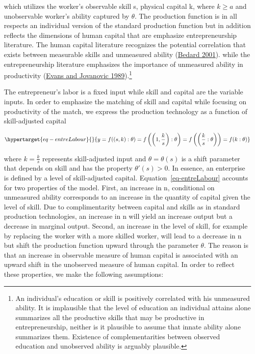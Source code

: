 \documentclass[
  a4paper,
  DIV=11,
  numbers=noendperiod]{scrartcl}
\begin{document}
which utilizes the worker's observable skill s, physical capital k,
where \(k \geq a\) and unobservable worker's ability captured by
\(\theta\). The production function is in all respects an individual
version of the standard production function but in addition reflects the
dimensions of human capital that are emphasize entrepreneurship
literature. The human capital literature recognizes the potential
correlation that exists between measurable skills and unmeasured ability
(\protect\hyperlink{ref-bedard2001}{Bedard 2001}). while the
entrepreneurship literature emphasizes the importance of unmeasured
ability in productivity (\protect\hyperlink{ref-evans1989}{Evans and
Jovanovic 1989}).\footnote{An individual's education or skill is
  positively correlated with his unmeasured ability. It is implausible
  that the level of education an individual attains alone summarizes all
  the productive skills that may be productive in entrepreneurship,
  neither is it plausible to assume that innate ability alone summarizes
  them. Existence of complementarities between observed education and
  unobserved ability is arguably plausible.}

The entrepreneur's labor is a fixed input while skill and capital are
the variable inputs. In order to emphasize the matching of skill and
capital while focusing on productivity of the match, we express the
production technology as a function of skill-adjusted capital

\begin{equation}\protect\hypertarget{eq-entreLabour}{}{
y=f((s,k):\theta)=f\left(\left(1,\frac{k}{s}\right):\theta\right)=f\left(\left(\frac{k}{s}:\theta \right)\right)=f(k:\theta)
}\label{eq-entreLabour}\end{equation}

where \(k=\frac{k}{s}\) represents skill-adjusted input and
\(\theta=\theta(s)\) is a shift parameter that depends on skill and has
the property \(\theta'(s)>0.\) In essence, an enterprise is defined by a
level of skill-adjusted capital. Equation~\ref{eq-entreLabour} accounts
for two properties of the model. First, an increase in n, conditional on
unmeasured ability corresponds to an increase in the quantity of capital
given the level of skill. Due to complimentarity between capital and
skills as in standard production technologies, an increase in n will
yield an increase output but a decrease in marginal output. Second, an
increase in the level of skill, for example by replacing the worker with
a more skilled worker, will lead to a decrease in n but shift the
production function upward through the parameter \(\theta\). The reason
is that an increase in observable measure of human capital is associated
with an upward shift in the unobserved measure of human capital. In
order to reflect these properties, we make the following assumptions:
\end{document}
